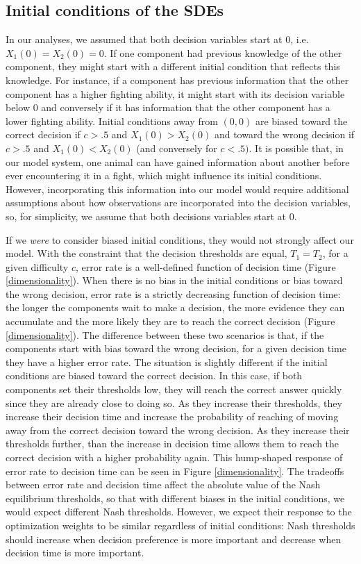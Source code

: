 \documentclass{article}
\begin{document}
\subsection{Initial conditions of the SDEs } 
In our analyses, we assumed that both decision variables start at $0$, i.e. $X_1(0)=X_2(0)=0$.  If one component had previous knowledge of the other component, they might start with a different initial condition that reflects this knowledge. For instance, if a component has previous information that the other component has a higher fighting ability, it might start with its decision variable below $0$ and conversely if it has information that the other component has a lower fighting ability. Initial conditions away from $(0,0)$ are biased toward the correct decision if $c>.5$ and $X_1(0)>X_2(0)$ and toward the wrong decision if $c>.5$ and $X_1(0)<X_2(0)$ (and conversely for $c<.5)$. It is possible that, in our model system, one animal can have gained information about another before ever encountering it in a fight, which might influence its initial conditions. However, incorporating this information into our model would require additional assumptions about how observations are incorporated into the decision variables, so, for simplicity, we assume that both decisions variables start at $0$.

If we \emph{were} to consider biased initial conditions, they would not strongly affect our model. With the constraint that the decision thresholds are equal, $T_1=T_2$, for a given difficulty $c$, error rate is a well-defined function of decision time (Figure \ref{dimensionality}). When there is no bias in the initial conditions or bias toward the wrong decision, error rate is a strictly decreasing function of decision time: the longer the components wait to make a decision, the more evidence they can accumulate and the more likely they are to reach the correct decision (Figure \ref{dimensionality}). The difference between these two scenarios is that, if the components start with bias toward the wrong decision, for a given decision time they have a higher error rate. The situation is slightly different if the initial conditions are biased toward the correct decision.  In this case, if both components set their thresholds low, they will reach the correct answer quickly since they are already close to doing so. As they increase their thresholds, they increase their decision time and increase the probability of reaching of moving away from the correct decision toward the wrong decision. As they increase their thresholds further, than the increase in decision time allows them to reach the correct decision with a higher probability again.  This hump-shaped response of error rate to decision time can be seen in Figure \ref{dimensionality}. The tradeoffs between error rate and decision time affect the absolute value of the Nash equilibrium thresholds, so that with different biases in the initial conditions, we would expect different Nash thresholds. However, we expect their response to the optimization weights to be similar regardless of initial conditions: Nash thresholds should increase when decision preference is more important and decrease when decision time is more important.
\end{document}
